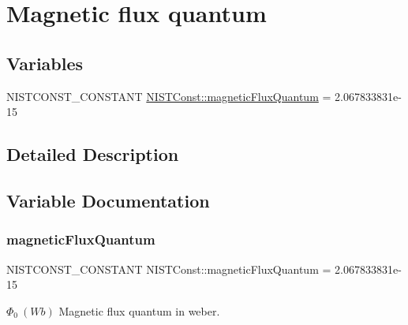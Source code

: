 \hypertarget{group___n_i_s_t_const-_magnetic_flux_quantum}{}\section{Magnetic flux quantum}
\label{group___n_i_s_t_const-_magnetic_flux_quantum}
\subsection*{Variables}
\begin{DoxyCompactItemize}
\item 
N\+I\+S\+T\+C\+O\+N\+S\+T\+\_\+\+C\+O\+N\+S\+T\+A\+NT \mbox{\hyperlink{group___n_i_s_t_const-_magnetic_flux_quantum_gade84700a3e9c0f4759560353e2da4dde}{N\+I\+S\+T\+Const\+::magnetic\+Flux\+Quantum}} = 2.\+067833831e-\/15
\end{DoxyCompactItemize}


\subsection{Detailed Description}


\subsection{Variable Documentation}
\mbox{\label{group___n_i_s_t_const-_magnetic_flux_quantum_gade84700a3e9c0f4759560353e2da4dde}} 
\subsubsection{\texorpdfstring{magnetic\+Flux\+Quantum}{magneticFluxQuantum}}
{\footnotesize\ttfamily N\+I\+S\+T\+C\+O\+N\+S\+T\+\_\+\+C\+O\+N\+S\+T\+A\+NT N\+I\+S\+T\+Const\+::magnetic\+Flux\+Quantum = 2.\+067833831e-\/15}

$\Phi_0 \ (Wb)$ Magnetic flux quantum in weber. 